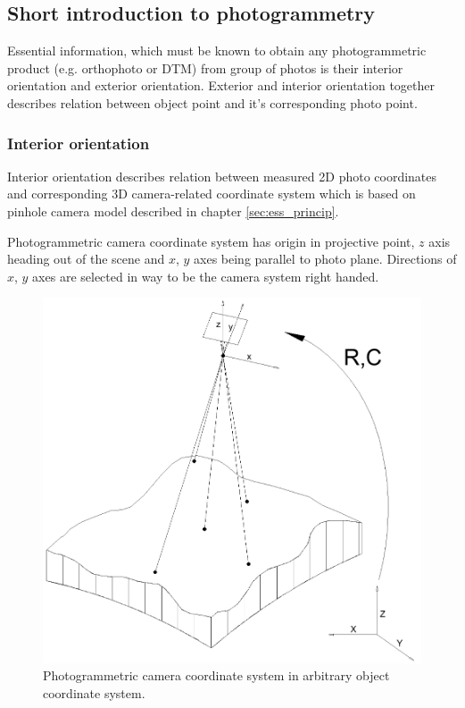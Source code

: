 \documentclass[a4paper,12pt]{article}
\begin{document}
\subsection{Short introduction to photogrammetry}

Essential information, which must be known to obtain any photogrammetric
 product (e.g. orthophoto or DTM) from group of photos is their interior orientation and exterior orientation.
Exterior and interior orientation together describes relation between object point and
it's corresponding photo point.

\subsubsection{Interior orientation}

Interior orientation describes relation between measured 2D photo coordinates 
and corresponding 3D camera-related coordinate system which is based on pinhole camera model described in chapter \ref{sec:ess_princip}.

Photogrammetric camera coordinate system has origin in projective point,
$z$ axis heading out of the scene  and $x$, $y$ axes being parallel to photo plane. Directions of 
$x$, $y$ axes are selected in way to be the camera system right handed.

\begin{figure}[h]
    \centering
    \includegraphics[scale=0.3]{figures/photogrammetric_model.png}
    \caption{Photogrammetric camera coordinate system in arbitrary object coordinate system.}
    \label{fig:ph_model}
\end{figure}
\end{document}
